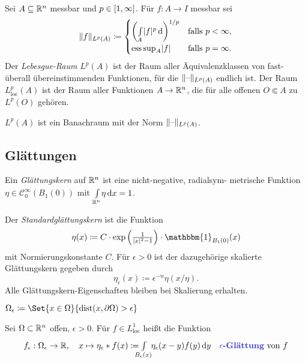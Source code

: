 \documentclass{cheat-sheet}
\newcommand{\ind}{\mathbbm{1}} %
\newcommand{\dist}{\mathrm{dist}} %
\DeclareMathOperator*{\esssup}{ess\,sup} %
\begin{document}
\begin{defn}
  Sei $A \subseteq \mathbb{R}^n$ messbar und $p \in \left[ 1, \infty \right]$. Für $f : A \to I$ messbar sei
  \[
    \norm{f}_{L^p(A)} \coloneqq \begin{cases}
      \left( \Int{A}{}{\abs{f}^p} \right)^{1/p} & \text{falls } p < \infty,\\
      \esssup_A \abs{f} & \text{falls } p = \infty.
    \end{cases}
  \]
  Der \emph{Lebesgue-Raum} $L^p(A)$ ist der Raum aller Äquivalenzklassen von fast-überall übereinstimmenden Funktionen, für die $\lVert\text{--}\rVert_{L^p(A)}$ endlich ist. Der Raum $L_{\text{loc}}^p(A)$ ist der Raum aller Funktionen $A \to \mathbb{R}^n$, die für alle offenen $O \Subset A$ zu $L^p(O)$ gehören.
\end{defn}

\begin{bem}
  $L^p(A)$ ist ein Banachraum mit der Norm $\lVert\text{--}\rVert_{L^p(A)}$.
\end{bem}


\subsection{Glättungen}

\begin{defn}
  Ein \emph{Glättungskern} auf $\mathbb{R}^n$ ist eine nicht-negative, radialsym- metrische Funktion $\eta \in \mathcal{C}_0^\infty(B_1(0))$ mit ${\textstyle \int\limits_{\mathbb{R}^n}^{}} \eta \,\mathrm{d} x = 1$.
\end{defn}

\begin{defn}
  Der \emph{Standardglättungskern} ist die Funktion
  \[ \eta(x) \coloneqq C \cdot \exp \left(\tfrac{1}{\abs{x}^2 - 1}\right) \cdot \ind_{B_1(0)}(x) \]
  mit Normierungskonstante $C$. Für $\epsilon > 0$ ist der dazugehörige skalierte Glättungskern gegeben durch
  \[ \eta_{\epsilon}(x) \coloneqq \epsilon^{-n} \eta(x/\eta). \]
  Alle Glättungskern-Eigenschaften bleiben bei Skalierung erhalten.
\end{defn}

\begin{nota}
  $\Omega_{\epsilon} \coloneqq \Set{ x \in \Omega }{ \dist(x, \partial \Omega) > \epsilon }$
\end{nota}

\begin{defn}
  Sei $\Omega \subset \mathbb{R}^n$ offen, $\epsilon > 0$. Für $f \in L_{\text{loc}}^1$ heißt die Funktion
  \[
    f_\epsilon : \Omega_{\epsilon} \to \R, \quad
    x \mapsto \eta_\epsilon * f(x) \coloneqq \Int{\mathclap{B_{\epsilon}(x)}}{}{\enspace\eta_{\epsilon}(x-y) f(y)}{y}
    \quad \text{\emph{$\epsilon$-Glättung} von $f$}
  \]
\end{defn}
\end{document}
